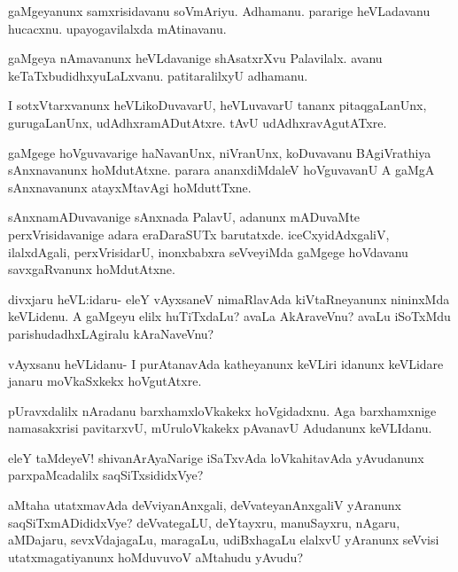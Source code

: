 \documentclass{article}
\begin{document}
\begin{mng}%
gaMgeyanunx samxrisidavanu soVmAriyu. Adhamanu. pararige heVLadavanu hucacxnu. upayogavilalxda mAtinavanu.
\end{mng}

\begin{mng}%
gaMgeya nAmavanunx heVLdavanige shAsatxrXvu Palavilalx. avanu keTaTxbudidhxyuLaLxvanu. patitaralilxyU adhamanu.
\end{mng}

\begin{mng}%
I sotxVtarxvanunx heVLikoDuvavarU, heVLuvavarU tananx pitaqgaLanUnx, gurugaLanUnx, udAdhxramADutAtxre. tAvU udAdhxravAgutATxre.
\end{mng}

\begin{mng}%
gaMgege hoVguvavarige haNavanUnx, niVranUnx, koDuvavanu BAgiVrathiya sAnxnavanunx hoMdutAtxne. parara ananxdiMdaleV hoVguvavanU A gaMgA sAnxnavanunx atayxMtavAgi hoMduttTxne.
\end{mng}

\begin{mng}%
sAnxnamADuvavanige sAnxnada PalavU, adanunx mADuvaMte perxVrisidavanige adara eraDaraSUTx barutatxde. iceCxyidAdxgaliV, ilalxdAgali, perxVrisidarU, inonxbabxra seVveyiMda gaMgege hoVdavanu savxgaRvanunx hoMdutAtxne.
\end{mng}

\begin{mng}%
divxjaru heVL:idaru- eleY vAyxsaneV nimaRlavAda kiVtaRneyanunx nininxMda keVLidenu. A gaMgeyu elilx huTiTxdaLu? avaLa AkAraveVnu? avaLu iSoTxMdu parishudadhxLAgiralu kAraNaveVnu?
\end{mng}

\begin{mng}%
vAyxsanu heVLidanu- I purAtanavAda katheyanunx keVLiri idanunx keVLidare janaru moVkaSxkekx hoVgutAtxre.
\end{mng}

\begin{mng}%
pUravxdalilx nAradanu barxhamxloVkakekx hoVgidadxnu. Aga barxhamxnige namasakxrisi pavitarxvU, mUruloVkakekx pAvanavU Adudanunx keVLIdanu.
\end{mng}

\begin{mng}%
eleY taMdeyeV! shivanArAyaNarige iSaTxvAda loVkahitavAda yAvudanunx parxpaMcadalilx saqSiTxsididxVye?
\end{mng}

\begin{mng}%
aMtaha utatxmavAda deVviyanAnxgali, deVvateyanAnxgaliV yAranunx saqSiTxmADididxVye? deVvategaLU, deYtayxru, manuSayxru, nAgaru, aMDajaru, sevxVdajagaLu, maragaLu, udiBxhagaLu elalxvU yAranunx seVvisi utatxmagatiyanunx hoMduvuvoV aMtahudu yAvudu?
\end{mng}
\end{document}
